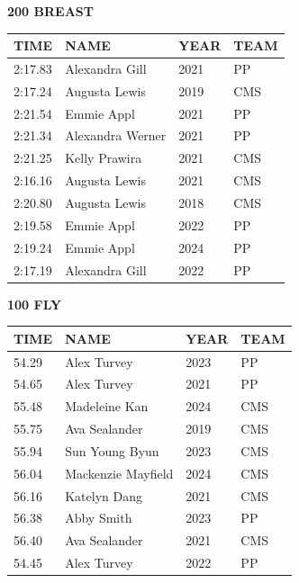 \begin{table}[H]
\centering
\begin{minipage}[t]{0.48\textwidth}
\centering
\textbf{200 BREAST}\\[0.1cm]
\begin{tabular}{@{}p{1.8cm}p{2.8cm}p{1.2cm}p{1.4cm}@{}}
\hline
    \textbf{TIME} & \textbf{NAME} & \textbf{YEAR} & \textbf{TEAM} \\
\hline
    2:17.83 & Alexandra Gill & 2021 & PP \\
    2:17.24 & Augusta Lewis & 2019 & CMS \\
    2:21.54 & Emmie Appl & 2021 & PP \\
    2:21.34 & Alexandra Werner & 2021 & PP \\
    2:21.25 & Kelly Prawira & 2021 & CMS \\
    2:16.16 & Augusta Lewis & 2021 & CMS \\
    2:20.80 & Augusta Lewis & 2018 & CMS \\
    2:19.58 & Emmie Appl & 2022 & PP \\
    2:19.24 & Emmie Appl & 2024 & PP \\
    2:17.19 & Alexandra Gill & 2022 & PP \\
\hline
\end{tabular}
\end{minipage}\hfill
\begin{minipage}[t]{0.48\textwidth}
\centering
\textbf{100 FLY}\\[0.1cm]
\begin{tabular}{@{}p{1.8cm}p{2.8cm}p{1.2cm}p{1.4cm}@{}}
\hline
    \textbf{TIME} & \textbf{NAME} & \textbf{YEAR} & \textbf{TEAM} \\
\hline
    54.29 & Alex Turvey & 2023 & PP \\
    54.65 & Alex Turvey & 2021 & PP \\
    55.48 & Madeleine Kan & 2024 & CMS \\
    55.75 & Ava Sealander & 2019 & CMS \\
    55.94 & Sun Young Byun & 2023 & CMS \\
    56.04 & Mackenzie Mayfield & 2024 & CMS \\
    56.16 & Katelyn Dang & 2021 & CMS \\
    56.38 & Abby Smith & 2023 & PP \\
    56.40 & Ava Sealander & 2021 & CMS \\
    54.45 & Alex Turvey & 2022 & PP \\
\hline
\end{tabular}
\end{minipage}
\end{table}


